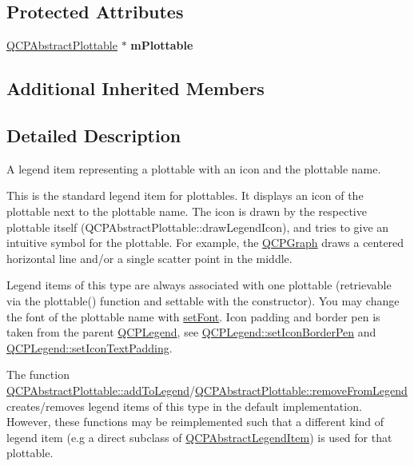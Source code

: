 \subsection*{Protected Attributes}
\begin{DoxyCompactItemize}
\item 
\hyperlink{classQCPAbstractPlottable}{Q\+C\+P\+Abstract\+Plottable} $\ast$ {\bfseries m\+Plottable}\hypertarget{classQCPPlottableLegendItem_ada647fb4b22971a1a424e15b4f6af0d9}{}\label{classQCPPlottableLegendItem_ada647fb4b22971a1a424e15b4f6af0d9}

\end{DoxyCompactItemize}
\subsection*{Additional Inherited Members}


\subsection{Detailed Description}
A legend item representing a plottable with an icon and the plottable name. 

This is the standard legend item for plottables. It displays an icon of the plottable next to the plottable name. The icon is drawn by the respective plottable itself (Q\+C\+P\+Abstract\+Plottable\+::draw\+Legend\+Icon), and tries to give an intuitive symbol for the plottable. For example, the \hyperlink{classQCPGraph}{Q\+C\+P\+Graph} draws a centered horizontal line and/or a single scatter point in the middle.

Legend items of this type are always associated with one plottable (retrievable via the plottable() function and settable with the constructor). You may change the font of the plottable name with \hyperlink{classQCPAbstractLegendItem_a409c53455d8112f71d70c0c43eb10265}{set\+Font}. Icon padding and border pen is taken from the parent \hyperlink{classQCPLegend}{Q\+C\+P\+Legend}, see \hyperlink{classQCPLegend_a2f2c93d18a651f4ff294bb3f026f49b8}{Q\+C\+P\+Legend\+::set\+Icon\+Border\+Pen} and \hyperlink{classQCPLegend_a62973bd69d5155e8ea3141366e8968f6}{Q\+C\+P\+Legend\+::set\+Icon\+Text\+Padding}.

The function \hyperlink{classQCPAbstractPlottable_a70f8cabfd808f7d5204b9f18c45c13f5}{Q\+C\+P\+Abstract\+Plottable\+::add\+To\+Legend}/\hyperlink{classQCPAbstractPlottable_aa1f350e510326d012b9a9c9249736c83}{Q\+C\+P\+Abstract\+Plottable\+::remove\+From\+Legend} creates/removes legend items of this type in the default implementation. However, these functions may be reimplemented such that a different kind of legend item (e.\+g a direct subclass of \hyperlink{classQCPAbstractLegendItem}{Q\+C\+P\+Abstract\+Legend\+Item}) is used for that plottable.

